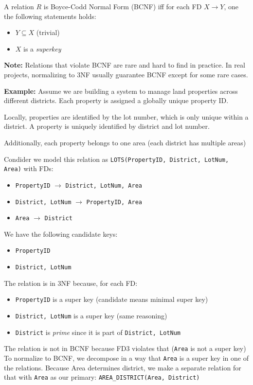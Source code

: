 \documentclass{article}
\begin{document}
A relation $R$ is Boyce-Codd Normal Form (BCNF) iff for each FD $X \to Y$, one the following statements holds:
\begin{itemize}
    \item $Y \subseteq X$ (trivial)
    \item $X$ is a \textit{superkey}
\end{itemize}

\textbf{Note: }Relations that violate BCNF are rare and hard to find in practice. In real projects, normalizing to 3NF usually guarantee BCNF except for some rare cases.

\textbf{Example: }Assume we are building a system to manage land properties across different districts. Each property is assigned a globally unique property ID.

Locally, properties are identified by the lot number, which is only unique within a district. A property is uniquely identified by district and lot number.

Additionally, each property belongs to one area (each district has multiple areas)

Condider we model this relation as \texttt{LOTS(PropertyID, District, LotNum, Area)} with FDs:
\begin{itemize}
    \item \texttt{PropertyID} $\to$ \texttt{District, LotNum, Area}
    \item \texttt{District, LotNum} $\to$ \texttt{PropertyID, Area}
    \item \texttt{Area} $\to$ \texttt{District}
\end{itemize}
We have the following candidate keys:
\begin{itemize}
    \item \texttt{PropertyID}
    \item \texttt{District, LotNum}
\end{itemize}
The relation is in 3NF because, for each FD:
\begin{itemize}
    \item \texttt{PropertyID} is a super key (candidate means minimal super key)
    \item \texttt{District, LotNum} is a super key (same reasoning)
    \item \texttt{District} is \textit{prime} since it is part of \texttt{District, LotNum}
\end{itemize}
The relation is not in BCNF because FD3 violates that (\texttt{Area} is not a super key)
To normalize to BCNF, we decompose in a way that \texttt{Area} is a super key in one of the relations. Because Area determines district, we make a separate relation for that with \texttt{Area} as our primary:
\texttt{AREA\_DISTRICT(Area, District)}
\end{document}
